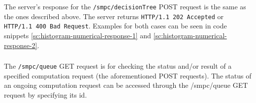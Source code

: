\begin{description}[labelwidth=5em, leftmargin=\dimexpr\labelwidth+\labelsep\relax]
\item[Response:] The server's response for the \texttt{/smpc/decisionTree} POST request is the same as the ones described above. The server returns \texttt{HTTP/1.1 202 Accepted} or \texttt{HTTP/1.1 400 Bad Request}. Examples for both cases can be seen in code snippets \ref{sc:histogram-numerical-response-1} and \ref{sc:histogram-numerical-response-2}.

\end{description}



\subsubsection[/smpc/queue GET request]{\protect{}}\label{sss:get1}
The \texttt{/smpc/queue} GET request is for checking the status and/or result of a specified computation request (the aforementioned POST requests).
The status of an ongoing computation request can be accessed through the /smpc/queue GET request by specifying its id.
